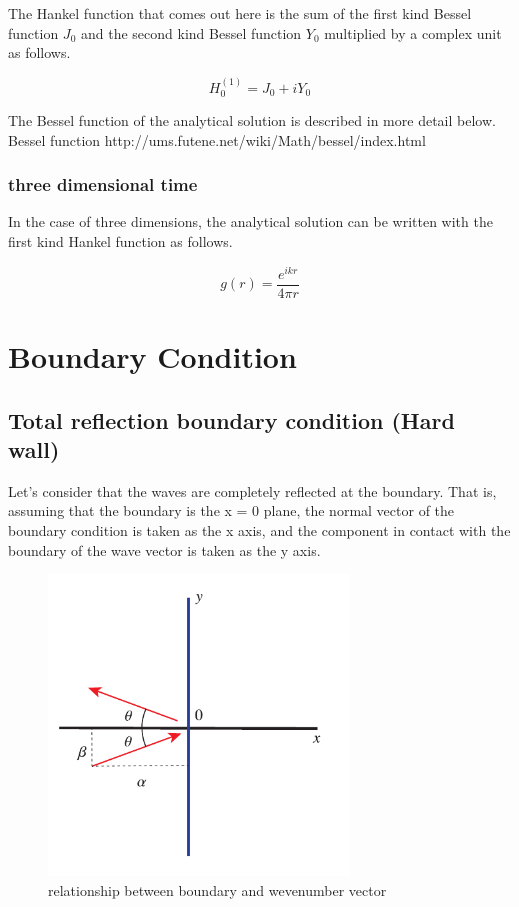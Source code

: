 The Hankel function that comes out here is the sum of the first kind Bessel function $J_0$ and the second kind Bessel function $Y_0$ multiplied by a complex unit as follows.

\begin{equation}
H^{(1)}_0 = J_0 + iY_0
\end{equation}

The Bessel function of the analytical solution is described in more detail below.
Bessel function http://ums.futene.net/wiki/Math/bessel/index.html

\subsubsection{three dimensional time}

In the case of three dimensions, the analytical solution can be written with the first kind Hankel function as follows.

\begin{equation}
g(r)=\frac{e^{ikr}}{4\pi r}
\end{equation}



\section{Boundary Condition}

\subsection{Total reflection boundary condition (Hard wall)}

Let's consider that the waves are completely reflected at the boundary. That is, assuming that the boundary is the x = 0 plane, the normal vector of the boundary condition is taken as the x axis, and the component in contact with the boundary of the wave vector is taken as the y axis.

\begin{figure}[htbp!]
\center
\includegraphics[width=80mm]{images/ref_boundary.pdf}
\caption{relationship between boundary and wevenumber vector}
\end{figure}

